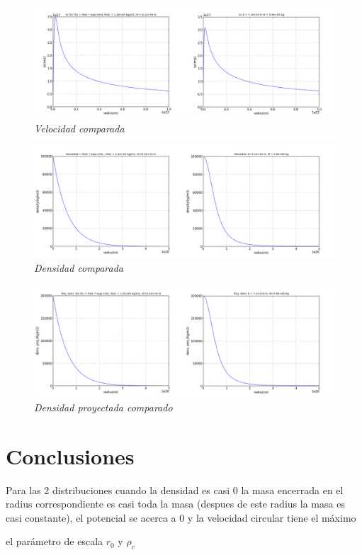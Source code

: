 \documentclass[12pt]{book}
\begin{document}
\begin{figure}[!ht]
 \centering
 \includegraphics[scale=0.3]{vcAnComp.png}
 \caption{\emph{Velocidad comparada}}
\end{figure}

\begin{figure}[!ht]
 \centering
 \includegraphics[scale=0.3]{densAnComp.png}
 \caption{\emph{Densidad comparada}}
\end{figure}

\begin{figure}[!ht]
 \centering
 \includegraphics[scale=0.3]{dpAnComp.png}
 \caption{\emph{Densidad proyectada comparado}}
\end{figure}


\clearpage

\section*{Conclusiones}
\begin{description}
\item Para las 2 distribuciones cuando la densidad es casi 0 la masa encerrada en el radius correspondiente es casi toda la masa (despues de este radius la masa es casi constante), el potencial se acerca a 0 y la velocidad circular tiene el máximo
\item el parámetro de escala $r_0$ y $\rho_c$
\end{description}
\end{document}
